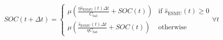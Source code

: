 \begin{equation}
	SOC(t+\Delta t) = 
	\begin{cases}
		\mu\left(\frac{\eta \hat{s}_\text{ESMU}(t)\Delta t}{C_\text{bat}} + SOC(t)\right)	&\text{if } \hat{s}_\text{ESMU}(t) \geq 0\\
		\mu\left(\frac{\hat{s}_\text{ESMU}(t)\Delta t}{\eta C_\text{bat}} + SOC(t)\right) &\text{otherwise}
	\end{cases}
	\forall t
	\label{ch1:equ:next-state-of-charge-2}
\end{equation}